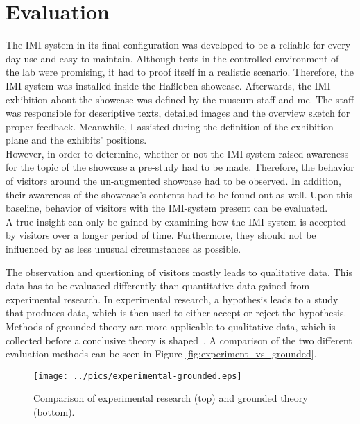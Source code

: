 \chapter{Evaluation}
\label{evaluation}

The \ac{IMI}-system in its final configuration was developed to be a reliable for every day use and easy to maintain. Although tests in the controlled environment of the lab were promising, it had to proof itself in a realistic scenario. Therefore, the \ac{IMI}-system was installed inside the Haßleben-showcase. Afterwards, the \ac{IMI}-exhibition about the showcase was defined by the museum staff and me. The staff was responsible for descriptive texts, detailed images and the overview sketch for proper feedback. Meanwhile, I assisted during the definition of the exhibition plane and the exhibits' positions.
\\
However, in order to determine, whether or not the \ac{IMI}-system raised awareness for the topic of the showcase a pre-study had to be made. Therefore, the behavior of visitors around the un-augmented showcase had to be observed. In addition, their awareness of the showcase's contents had to be found out as well. Upon this baseline, behavior of visitors with the \ac{IMI}-system present can be evaluated.
\\
A true insight can only be gained by examining how the \ac{IMI}-system is accepted by visitors over a longer period of time. Furthermore, they should not be influenced by as less unusual circumstances as possible.

The observation and questioning of visitors mostly leads to qualitative data. This data has to be evaluated differently than quantitative data gained from experimental research. In experimental research, a hypothesis leads to a study that produces data, which is then used to either accept or reject the hypothesis. Methods of grounded theory are more applicable to qualitative data, which is collected before a conclusive theory is shaped~\cite{GroundedTheory}. A comparison of the two different evaluation methods can be seen in Figure \ref{fig:experiment_vs_grounded}.
\begin{figure}[H]%
\texttt{[image: ../pics/experimental-grounded.eps]}%
\caption{Comparison of experimental research (top) and grounded theory (bottom).~\cite{GroundedTheory}}
\label{fig:new_target} %
\end{figure}
 
